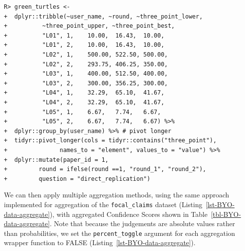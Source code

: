 \documentclass[article]{jss}
\begin{document}
\begin{verbatim}
R> green_turtles <-
+  dplyr::tribble(~user_name, ~round, ~three_point_lower,
+          ~three_point_upper, ~three_point_best,
+          "L01", 1,    10.00,  16.43,  10.00,
+          "L01", 2,    10.00,  16.43,  10.00,
+          "L02", 1,    500.00, 522.50, 500.00,
+          "L02", 2,    293.75, 406.25, 350.00,
+          "L03", 1,    400.00, 512.50, 400.00,
+          "L03", 2,    300.00, 356.25, 300.00,
+          "L04", 1,    32.29,  65.10,  41.67,
+          "L04", 2,    32.29,  65.10,  41.67,
+          "L05", 1,    6.67,   7.74,   6.67,
+          "L05", 2,    6.67,   7.74,   6.67) %>%
+  dplyr::group_by(user_name) %>% # pivot longer
+  tidyr::pivot_longer(cols = tidyr::contains("three_point"),
+               names_to = "element", values_to = "value") %>%
+  dplyr::mutate(paper_id = 1,
+         round = ifelse(round ==1, "round_1", "round_2"),
+         question = "direct_replication")
\end{verbatim}

We can then apply multiple aggregation methods, using the same approach
implemented for aggregation of the \texttt{focal\_claims} dataset
(Listing~\ref{lst-BYO-data-aggregate}), with aggregated Confidence
Scores shown in Table~\ref{tbl-BYO-data-aggregate}. Note that because
the judgements are absolute values rather than probabilities, we set the
\texttt{percent\_toggle} argument for each aggregation wrapper function
to {FALSE} (Listing~\ref{lst-BYO-data-aggregate}).

\begin{table}


\caption{\label{tbl-BYO-data-aggregate}Example aggregation of
non-percentage / non-probabilistic estimates with several aggregation
methods using Green Turtle dataset (Arlidge \emph{et al}. 2020).}

\end{table}%
\end{document}
